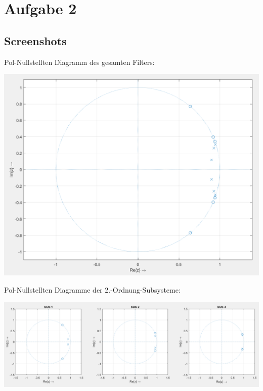 \newpage

\section{Aufgabe 2}

\subsection{Screenshots}

Pol-Nullstellten Diagramm des gesamten Filters:
\begin{center}
\includegraphics[scale=0.52]{UE02_2_filt1_zplane.png}
\end{center}

Pol-Nullstellten Diagramme der 2.-Ordnung-Subsysteme:
\begin{center}
\includegraphics[scale=0.52]{UE02_2_SOS123_zplane.png}
\end{center}

\newpage

